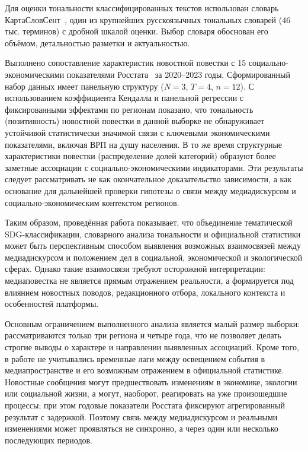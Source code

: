 \documentclass[master, och, coursework]{SCWorks1}
\begin{document}
Для оценки тональности классифицированных текстов использован словарь КартаСловСент~\cite{Kartaslovsent}, один из крупнейших русскоязычных тональных словарей (46 тыс. терминов) с дробной шкалой оценки. Выбор словаря обоснован его объёмом, детальностью разметки и актуальностью.

Выполнено сопоставление характеристик новостной повестки с 15 социально-экономическими показателями Росстата~\cite{Rosstat2024} за 2020--2023 годы. Сформированный набор данных имеет панельную структуру ($N=3$, $T=4$, $n=12$). С использованием коэффициента Кендалла и панельной регрессии с фиксированными эффектами по регионам показано, что тональность (позитивность) новостной повестки в данной выборке не обнаруживает устойчивой статистически значимой связи с ключевыми экономическими показателями, включая ВРП на душу населения. В то же время структурные характеристики повестки (распределение долей категорий) образуют более заметные ассоциации с социально-экономическими индикаторами. Эти результаты следует рассматривать не как окончательное доказательство зависимости, а как основание для дальнейшей проверки гипотезы о связи между медиадискурсом и социально-экономическим контекстом регионов.

Таким образом, проведённая работа показывает, что объединение тематической SDG-классификации, словарного анализа тональности и официальной статистики может быть перспективным способом выявления возможных взаимосвязей между медиадискурсом и положением дел в социальной, экономической и экологической сферах. Однако такие взаимосвязи требуют осторожной интерпретации: медиаповестка не является прямым отражением реальности, а формируется под влиянием новостных поводов, редакционного отбора, локального контекста и особенностей платформы.

Основным ограничением выполненного анализа является малый размер выборки: рассматриваются только три региона и четыре года, что не позволяет делать строгие выводы о характере и направлении выявленных ассоциаций. Кроме того, в работе не учитывались временные лаги между освещением события в медиапространстве и его возможным отражением в официальной статистике. Новостные сообщения могут предшествовать изменениям в экономике, экологии или социальной жизни, а могут, наоборот, реагировать на уже произошедшие процессы; при этом годовые показатели Росстата фиксируют агрегированный результат с задержкой. Поэтому связь между медиадискурсом и реальными изменениями может проявляться не синхронно, а через один или несколько последующих периодов.
\end{document}
